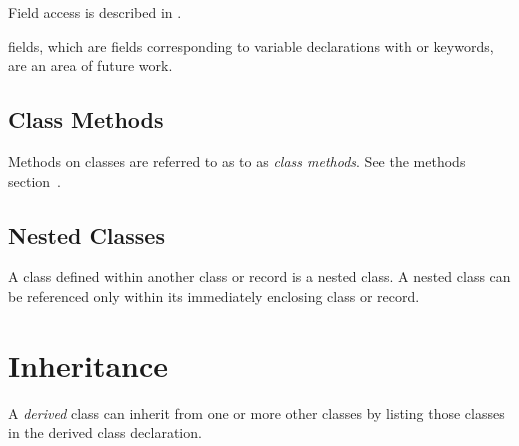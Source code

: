 Field access is described in .

\begin{future}
 fields, which are fields corresponding to variable declarations
with  or  keywords, are an area of future work.
\end{future}

\subsection{Class Methods}
\label{Class_Methods}

Methods on classes are referred to as to as \emph{class methods}.
See the methods section~.

\subsection{Nested Classes}
\label{Nested_Classes}

A class defined within another class or record is a nested class. A nested
class can be referenced only within its immediately enclosing class or record.

\section{Inheritance}
\label{Inheritance}

A \emph{derived} class can inherit from one or more other classes by
listing those classes in the derived class declaration.




